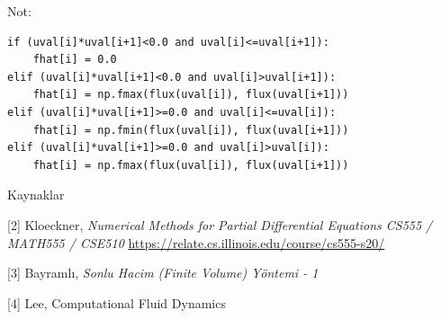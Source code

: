 \documentclass[12pt,fleqn]{article}\usepackage{../../common}
\begin{document}
Not:

\begin{verbatim}
if (uval[i]*uval[i+1]<0.0 and uval[i]<=uval[i+1]):
    fhat[i] = 0.0
elif (uval[i]*uval[i+1]<0.0 and uval[i]>uval[i+1]):
    fhat[i] = np.fmax(flux(uval[i]), flux(uval[i+1]))
elif (uval[i]*uval[i+1]>=0.0 and uval[i]<=uval[i]):
    fhat[i] = np.fmin(flux(uval[i]), flux(uval[i+1]))
elif (uval[i]*uval[i+1]>=0.0 and uval[i]>uval[i]):
    fhat[i] = np.fmax(flux(uval[i]), flux(uval[i+1]))
\end{verbatim}

  
Kaynaklar

[2] Kloeckner, {\em Numerical Methods for Partial Differential Equations CS555 / MATH555 / CSE510}
    \url{https://relate.cs.illinois.edu/course/cs555-s20/}

[3] Bayramlı, {\em Sonlu Hacim (Finite Volume) Yöntemi - 1}

[4] Lee, Computational Fluid Dynamics
\end{document}
